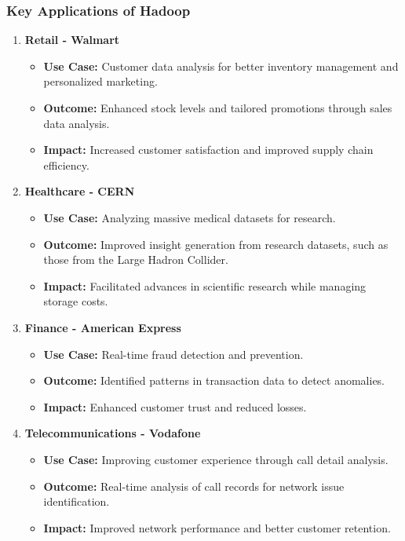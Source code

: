\documentclass[aspectratio=169]{beamer}
\begin{document}
\begin{frame}[fragile]
    \frametitle{Key Applications of Hadoop}
    \begin{enumerate}
        \item \textbf{Retail - Walmart}
            \begin{itemize}
                \item \textbf{Use Case:} Customer data analysis for better inventory management and personalized marketing.
                \item \textbf{Outcome:} Enhanced stock levels and tailored promotions through sales data analysis.
                \item \textbf{Impact:} Increased customer satisfaction and improved supply chain efficiency.
            \end{itemize}
        
        \item \textbf{Healthcare - CERN}
            \begin{itemize}
                \item \textbf{Use Case:} Analyzing massive medical datasets for research.
                \item \textbf{Outcome:} Improved insight generation from research datasets, such as those from the Large Hadron Collider.
                \item \textbf{Impact:} Facilitated advances in scientific research while managing storage costs.
            \end{itemize}
        
        \item \textbf{Finance - American Express}
            \begin{itemize}
                \item \textbf{Use Case:} Real-time fraud detection and prevention.
                \item \textbf{Outcome:} Identified patterns in transaction data to detect anomalies.
                \item \textbf{Impact:} Enhanced customer trust and reduced losses.
            \end{itemize}
        
        \item \textbf{Telecommunications - Vodafone}
            \begin{itemize}
                \item \textbf{Use Case:} Improving customer experience through call detail analysis.
                \item \textbf{Outcome:} Real-time analysis of call records for network issue identification.
                \item \textbf{Impact:} Improved network performance and better customer retention.
            \end{itemize}
    \end{enumerate}
\end{frame}
\end{document}
